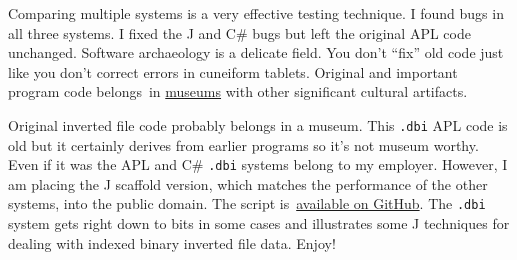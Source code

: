 Comparing multiple systems is a very effective testing technique. I
found bugs in all three systems. I fixed the J and C\# bugs but left the
original APL code unchanged. Software archaeology is a delicate field.
You don't ``fix'' old code just like you don't correct errors in
cuneiform tablets. Original and important program code belongs~in
\href{http://www.computerhistory.org/}{museums} with other significant
cultural artifacts.

Original inverted file code probably belongs in a museum. This
\texttt{.dbi} APL code is old but it certainly derives from earlier
programs so it's not museum worthy. Even if it was the APL and C\#
\texttt{.dbi} systems belong to my employer. However, I am placing the J
scaffold version, which matches the performance of the other systems,
into the public domain. The script
is~\href{https://github.com/bakerjd99/jacks/tree/master/dbi}{available
on GitHub}. The \texttt{.dbi} system gets right down to bits in some cases and
illustrates some J techniques for dealing with indexed binary inverted
file data. Enjoy!






%